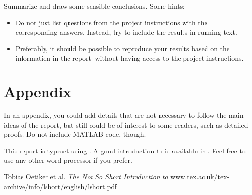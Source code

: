 \documentclass[a4paper,twocolumn]{article}
\begin{document}
Summarize and draw some sensible conclusions. Some hints:
\begin{itemize}
\item Do not just list questions from the project instructions with
  the corresponding answers. Instead, try to include the results in
  running text.
\item Preferably, it should be possible to reproduce your results
  based on the information in the report, without having access to the
  project instructions.
\end{itemize}

\section*{Appendix}

In an appendix, you could add details that are not necessary to follow
the main ideas of the report, but still could be of interest to some
readers, such as detailed proofs. Do not include MATLAB code, though.

This report is typeset using \LaTeXe. A good introduction to \LaTeXe
is available in \cite{latexmanual}. Feel free to use any other word
processor if you prefer.

%

\begin{thebibliography}{99}
 Tobias Oetiker et al. \textsl{The Not So Short
    Introduction to
    \LaTeXe}
    www.tex.ac.uk/tex-archive/info/lshort/english/lshort.pdf
\end{thebibliography}
\end{document}
